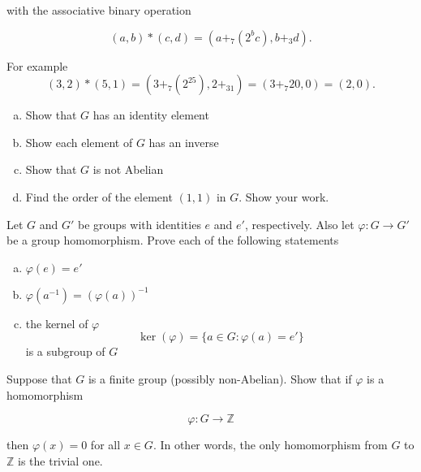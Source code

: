 \documentclass[11pt]{exam}
\theoremstyle{definition}
\begin{document}
\begin{questions}
with the associative binary operation

$$(a,b)\ast (c,d)  = (a +_7 (2^bc), b +_3 d).$$

For example
$$(3,2)*(5,1) = (3 +_7 (2^25),2+_31) = (3 +_7 20, 0) = (2,0).$$

\begin{enumerate}[(a)]
\item Show that $G$ has an identity element
\vspace{1.5in}
\item Show each element of $G$ has an inverse
\vspace{2in}
\item Show that $G$ is not Abelian
\vspace{2in}
\item Find the order of the element $(1,1)$ in $G$.  Show your work.
\vspace{2in}
\end{enumerate}

\newpage
\question[10]\mbox{}
Let $G$ and $G'$ be groups with identities $e$ and $e'$, respectively.  Also let $\varphi: G\rightarrow G'$ be a group homomorphism.  Prove each of the following statements

\begin{enumerate}[(a)]
\item $\varphi(e) = e'$
\vspace{2in}
\item $\varphi(a^{-1}) = (\varphi(a))^{-1}$
\vspace{2in}
\item the kernel of $\varphi$
$$\ker(\varphi) = \{a\in G: \varphi(a)=e'\}$$
is a subgroup of $G$
\vspace{2in}
\end{enumerate}


\newpage
\question[10]\mbox{}

Suppose that $G$ is a finite group (possibly non-Abelian).  Show that if $\varphi$ is a homomorphism

$$\varphi: G\rightarrow\mathbb Z$$

then $\varphi(x) = 0$ for all $x\in G$.  In other words, the only homomorphism from $G$ to $\mathbb Z$ is the trivial one.


\end{questions}
\end{document}
